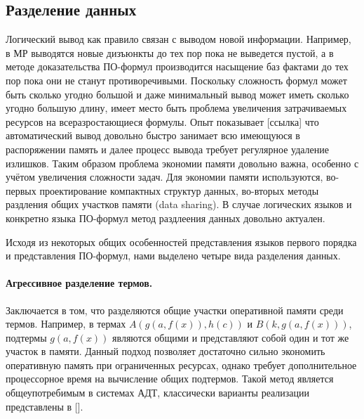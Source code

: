 \subsection{Разделение данных}
Логический вывод как правило связан с выводом новой информации. Например, в МР выводятся новые дизъюнкты до тех пор пока не выведется пустой, а в методе доказательства ПО-формул производится насыщение баз фактами до тех пор пока они не станут противоречивыми. Поскольку сложность формул может быть сколько угодно большой и даже минимальный вывод может иметь сколько угодно большую длину, имеет место быть проблема увеличения затрачиваемых ресурсов на всеразростающиеся формулы. Опыт показывает [ссылка] что автоматический вывод довольно быстро занимает всю имеющуюся в распоряжении память и далее процесс вывода требует регулярное удаление излишков. Таким образом проблема экономии памяти  довольно важна, особенно с учётом увеличения сложности задач. Для экономии памяти используются, во-первых проектирование компактных структур данных, во-вторых методы раздления общих участков памяти (data sharing). В случае логических языков и конкретно языка ПО-формул метод раздлеения данных довольно актуален.

Исходя из некоторых общих особенностей представления языков первого порядка и представления ПО-формул, нами выделено четыре вида разделения данных.

\paragraph{Агрессивное разделение термов.} Заключается в том, что разделяются общие участки оперативной памяти среди термов. Например, в термах $A(g(a,f(x)),h(c))$ и $B(k,g(a,f(x)))$, подтермы $g(a,f(x))$ являются общими и представляют собой один и тот же участок в памяти. Данный подход позволяет достаточно сильно экономить оперативную память при ограниченных ресурсах, однако требует дополнительное процессорное время на вычисление общих подтермов. Такой метод является общеупотребимым в системах АДТ, классически варианты реализации представлены в []. 

